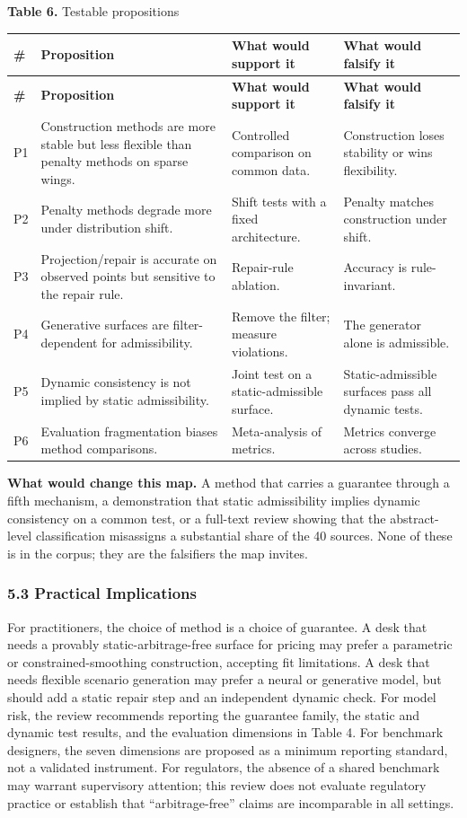 \documentclass[11pt]{article}
\begin{document}
\textbf{Table 6.} Testable propositions

\begingroup
\begin{longtable}{@{}p{}p{}p{}p{}@{}}
\toprule
\textbf{\#} & \textbf{Proposition} & \textbf{What would support it} & \textbf{What would falsify it} \\
\midrule
\endfirsthead
\toprule
\textbf{\#} & \textbf{Proposition} & \textbf{What would support it} & \textbf{What would falsify it} \\
\midrule
\endhead
P1 & Construction methods are more stable but less flexible than penalty methods on sparse wings. & Controlled comparison on common data. & Construction loses stability or wins flexibility. \\
P2 & Penalty methods degrade more under distribution shift. & Shift tests with a fixed architecture. & Penalty matches construction under shift. \\
P3 & Projection/repair is accurate on observed points but sensitive to the repair rule. & Repair-rule ablation. & Accuracy is rule-invariant. \\
P4 & Generative surfaces are filter-dependent for admissibility. & Remove the filter; measure violations. & The generator alone is admissible. \\
P5 & Dynamic consistency is not implied by static admissibility. & Joint test on a static-admissible surface. & Static-admissible surfaces pass all dynamic tests. \\
P6 & Evaluation fragmentation biases method comparisons. & Meta-analysis of metrics. & Metrics converge across studies. \\
\bottomrule
\end{longtable}
\endgroup

\textbf{What would change this map.} A method that carries a guarantee through a fifth mechanism, a demonstration that static admissibility implies dynamic consistency on a common test, or a full-text review showing that the abstract-level classification misassigns a substantial share of the 40 sources. None of these is in the corpus; they are the falsifiers the map invites.

\subsubsection*{5.3 Practical Implications}
For practitioners, the choice of method is a choice of guarantee. A desk that needs a provably static-arbitrage-free surface for pricing may prefer a parametric or constrained-smoothing construction, accepting fit limitations. A desk that needs flexible scenario generation may prefer a neural or generative model, but should add a static repair step and an independent dynamic check. For model risk, the review recommends reporting the guarantee family, the static and dynamic test results, and the evaluation dimensions in Table 4. For benchmark designers, the seven dimensions are proposed as a minimum reporting standard, not a validated instrument. For regulators, the absence of a shared benchmark may warrant supervisory attention; this review does not evaluate regulatory practice or establish that “arbitrage-free” claims are incomparable in all settings.
\end{document}

